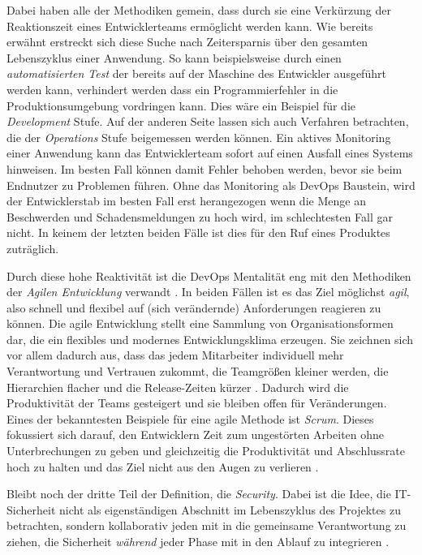 Dabei haben alle der Methodiken gemein, dass durch sie eine Verkürzung der Reaktionszeit eines Entwicklerteams ermöglicht werden kann. 
Wie bereits erwähnt erstreckt sich diese Suche nach Zeitersparnis über den gesamten Lebenszyklus einer Anwendung. So kann beispielsweise durch einen \emph{automatisierten Test} der bereits auf der Maschine des Entwickler ausgeführt werden kann, verhindert werden dass ein Programmierfehler in die Produktionsumgebung vordringen kann. Dies wäre ein Beispiel für die \emph{Development} Stufe. Auf der anderen Seite lassen sich auch Verfahren betrachten, die der \emph{Operations} Stufe beigemessen werden können. Ein aktives Monitoring einer Anwendung kann das Entwicklerteam sofort auf einen Ausfall eines Systems hinweisen. Im besten Fall können damit Fehler behoben werden, bevor sie beim Endnutzer zu Problemen führen. Ohne das Monitoring als DevOps Baustein, wird der Entwicklerstab im besten Fall erst herangezogen wenn die Menge an Beschwerden und Schadensmeldungen zu hoch wird, im schlechtesten Fall gar nicht. In keinem der letzten beiden Fälle ist dies für den Ruf eines Produktes zuträglich.

Durch diese hohe Reaktivität ist die DevOps Mentalität eng mit den Methodiken der \emph{Agilen Entwicklung} verwandt \cite{haufe-lexwaregmbhcokgAgileMethodenDefinition}. In beiden Fällen ist es das Ziel möglichst \emph{agil}, also schnell und flexibel auf (sich verändernde) Anforderungen reagieren zu können.
Die agile Entwicklung stellt eine Sammlung von Organisationsformen dar, die ein flexibles und modernes Entwicklungsklima erzeugen. Sie zeichnen sich vor allem dadurch aus, dass das jedem Mitarbeiter individuell mehr Verantwortung und Vertrauen zukommt, die Teamgrößen kleiner werden, die Hierarchien flacher und die Release-Zeiten kürzer \cite{haufe-lexwaregmbhcokgAgileMethodenDefinition}. Dadurch wird die Produktivität der Teams gesteigert und sie bleiben offen für Veränderungen. Eines der bekanntesten Beispiele für eine agile Methode ist \emph{Scrum}. Dieses fokussiert sich darauf, den Entwicklern Zeit zum ungestörten Arbeiten ohne Unterbrechungen zu geben und gleichzeitig die Produktivität und Abschlussrate hoch zu halten und das Ziel nicht aus den Augen zu verlieren \cite{froemlingAgileMethodenWas2021}.

Bleibt noch der dritte Teil der Definition, die \emph{Security}. Dabei ist die Idee, die IT-Sicherheit nicht als eigenständigen Abschnitt im Lebenszyklus des Projektes zu betrachten, sondern kollaborativ jeden mit in die gemeinsame Verantwortung zu ziehen, die Sicherheit \emph{während} jeder Phase mit in den Ablauf zu integrieren \cite{redheadWasIstDevSecOps}.

